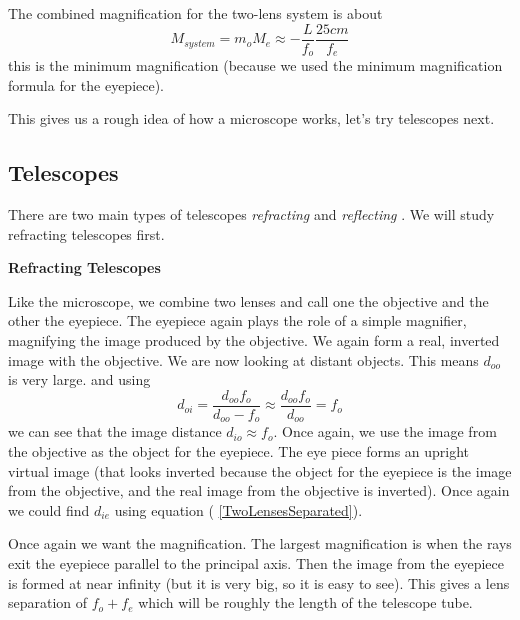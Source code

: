 \documentclass{article}
\begin{document}
The combined magnification for the two-lens system is about 
\begin{equation}
M_{system}=m_{o}M_{e}\approx -\frac{L}{f_{o}}\frac{25\unit{cm}}{f_{e}}
\end{equation}%
this is the minimum magnification (because we used the minimum magnification
formula for the eyepiece).

This gives us a rough idea of how a microscope works, let's try telescopes
next.

\subsection{Telescopes}

There are two main types of telescopes \emph{refracting} and \emph{reflecting%
}. We will study refracting telescopes first.

\textbf{Refracting Telescopes}

Like the microscope, we combine two lenses and call one the objective and
the other the eyepiece. The eyepiece again plays the role of a simple
magnifier, magnifying the image produced by the objective.%
We again form a real, inverted image with the objective. We are now looking
at distant objects. This means $d_{oo}$ is very large. and using%
\[
d_{oi}=\frac{d_{oo}f_{o}}{d_{oo}-f_{o}}\approx \frac{d_{oo}f_{o}}{d_{oo}}%
=f_{o}
\]%
we can see that the image distance $d_{io}\approx f_{o}.$ Once again, we use
the image from the objective as the object for the eyepiece. The eye piece
forms an upright virtual image (that looks inverted because the object for
the eyepiece is the image from the objective, and the real image from the
objective is inverted). Once again we could find $d_{ie}$ using equation (%
\ref{TwoLensesSeparated}).

Once again we want the magnification. The largest magnification is when the
rays exit the eyepiece parallel to the principal axis. Then the image from
the eyepiece is formed at near infinity (but it is very big, so it is easy
to see). This gives a lens separation of $f_{o}+f_{e}$ which will be roughly
the length of the telescope tube.
\end{document}
